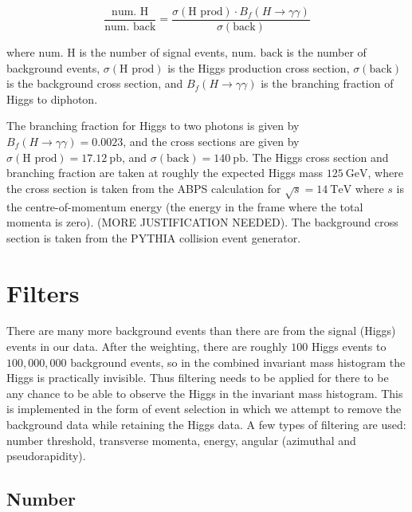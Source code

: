 \documentclass[11pt]{amsart}
\begin{document}
\begin{multicols}{2}
\begin{equation}
  \label{eq:weighting}
  \frac{\text{num. H}}{\text{num. back}} = \frac{\sigma{\left(\text{H prod}\right)} \cdot B_f\left(H\to\gamma\gamma\right)}{\sigma{\left(\text{back}\right)}}
\end{equation}

where $\text{num. H}$ is the number of signal events, $\text{num. back}$ is the number of background events, $\sigma{\left(\text{H prod}\right)}$ is the Higgs production cross section, $\sigma{\left(\text{back}\right)}$ is the background cross section, and $B_f\left(H\to\gamma\gamma\right)$ is the branching fraction of Higgs to diphoton.

The branching fraction for Higgs to two photons is given by $B_f\left(H\to\gamma\gamma\right) = 0.0023$, and the cross sections are given by $\sigma{\left(\text{H prod}\right)} = \SI{17.12}{\pico\barn}$, and $\sigma{\left(\text{back}\right)} = \SI{140}{\pico\barn}$. The Higgs cross section and branching fraction are taken at roughly the expected Higgs mass $\SI{125}{\giga\electronvolt}$, \cite{Higgs} where the cross section is taken from the ABPS calculation for $\sqrt{s} = \SI{14}{\tera\electronvolt}$ where $s$ is the centre-of-momentum energy (the energy in the frame where the total momenta is zero). \cite{HiggsCross1} \cite{COMframe} (MORE JUSTIFICATION NEEDED). The background cross section is taken from the PYTHIA collision event generator.

\section{Filters}
\label{sec:filters}

There are many more background events than there are from the signal (Higgs) events in our data. After the weighting, there are roughly $100$ Higgs events to $100,000,000$ background events, so in the combined invariant mass histogram the Higgs is practically invisible. Thus filtering needs to be applied for there to be any chance to be able to observe the Higgs in the invariant mass histogram. This is implemented in the form of event selection in which we attempt to remove the background data while retaining the Higgs data. A few types of filtering are used: number threshold, transverse momenta, energy, angular (azimuthal and pseudorapidity).

\subsection{Number}


\end{multicols}
\end{document}
